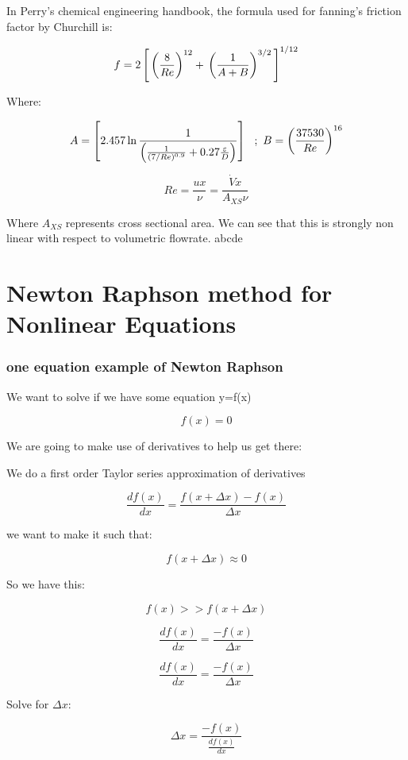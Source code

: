 \documentclass[12pt]{article}
\renewcommand{\_}{\kern-1.5pt\textunderscore\kern-1.5pt}
\begin{document}
In Perry's chemical engineering handbook, the formula used for fanning's friction factor by Churchill is:

$$f = 2 \left[\\
\left( \frac{8}{Re} \right)^{12} + \\
\left( \frac{1}{A+B}\right)^{3/2} \\
\right]^{1/12} $$
 
Where:

$$A = \left[ 2.457 \ln \frac{1}{\left( \frac{1}{(7/Re)^{0.9}} + \\
0.27 \frac{\varepsilon}{D} \right)} \\
\right]\ \ ; \ \ \\
B = \left( \frac{37530}{Re} \\ 
\right)^{16} $$


$$Re = \frac{ux}{\nu} = \frac{\dot{V} x}{A_{XS} \nu}$$

Where $A_{XS}$ represents cross sectional area.
We can see that this is strongly non linear with respect to volumetric flowrate.
abcde

\part{Newton Raphson method for Nonlinear Equations}

\section{one equation example of Newton Raphson}
We want to solve if we have some equation y=f(x)

$$f(x)=0$$

We are going to make use of derivatives to help us get there:

We do a first order Taylor series approximation of derivatives

$$\frac{d f(x)}{dx} = \frac{f(x + \Delta x) - f(x)}{\Delta x}$$

we want to make it such that:

$$f(x + \Delta x) \approx 0$$

So we have this:

$$f(x) >> f(x+\Delta x)$$

$$\frac{d f(x)}{dx} = \frac{ - f(x)}{\Delta x}$$

$$\frac{d f(x)}{dx} = \frac{ - f(x)}{\Delta x}$$

Solve for $\Delta x$:

$$\Delta x = \frac{ - f(x)}{\frac{d f(x)}{dx}}$$
\end{document}
